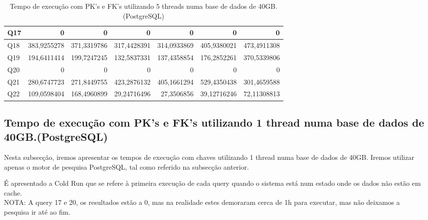 \documentclass{article}
\begin{document}
\begin{table}[H]
{\begin{tabular}{|l|r|r|r|r|r|r|}
        Q17&	0	&0	&0&	0	&0	&0\\ \hline
        Q18&	383,9255278	&371,3319786&	317,4428391&	314,0933869	&405,9380021&	473,4911308\\ \hline
        Q19&	194,6411414	&199,7247245&	132,5837331&	137,4358854	&176,2852261&	370,5339806\\ \hline
        Q20&	0	&0	&0&	0	&0	&0 \\ \hline
        Q21&	280,6747723	&271,8449755&	423,2876132	&405,1661294	&529,4350438	&301,4659588\\ \hline
        Q22&	109,0598404&	168,4960899&	29,24716496&	27,3506856	&39,12716246	&72,11308813\\ \hline
    \end{tabular}}
    \caption{Tempo de execução com PK's e FK's utilizando 5 threads numa base de dados de 40GB.(PostgreSQL)}
    \label{tab:BC_Table6}
  \end{table}


\clearpage
  \subsection{Tempo de execução com PK's e FK's utilizando 1 thread numa base de dados de 40GB.(PostgreSQL)}
  \texttt{}\par Nesta subsecção, iremos apresentar os tempos de execução com chaves utilizando 1 thread numa base de dados de 40GB. Iremos utilizar apenas o motor de pesquisa PostgreSQL, tal como referido na subsecção anterior.\\ 
  \texttt{}\par É apresentado a Cold Run que se refere à primeira execução de cada query quando o sistema está num estado onde os dados não estão em cache.\\
  NOTA: A query 17 e 20, os resultados estão a 0, mas na realidade estes demoraram cerca de 1h para executar, mas não deixamos a pesquisa ir até ao fim.
  
\end{document}
